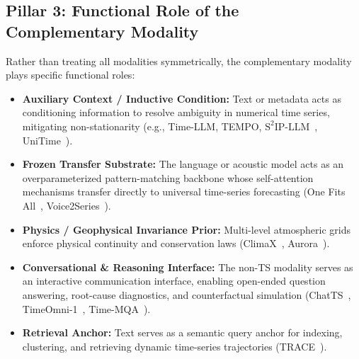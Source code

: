 \subsection{Pillar 3: Functional Role of the Complementary Modality}
Rather than treating all modalities symmetrically, the complementary modality plays specific functional roles:
\begin{itemize}
    \item \textbf{Auxiliary Context / Inductive Condition:} Text or metadata acts as conditioning information to resolve ambiguity in numerical time series, mitigating non-stationarity (e.g., Time-LLM, TEMPO, $\text{S}^2\text{IP-LLM}$~\cite{Pan2024S2IPLLM}, UniTime~\cite{Liu2024UniTime}).
    \item \textbf{Frozen Transfer Substrate:} The language or acoustic model acts as an overparameterized pattern-matching backbone whose self-attention mechanisms transfer directly to universal time-series forecasting (One Fits All~\cite{Zhou2023OneFitsAll}, Voice2Series~\cite{Yang2021Voice2Series}).
    \item \textbf{Physics / Geophysical Invariance Prior:} Multi-level atmospheric grids enforce physical continuity and conservation laws (ClimaX~\cite{Nguyen2023ClimaX}, Aurora~\cite{Bodnar2024Aurora}).
    \item \textbf{Conversational \& Reasoning Interface:} The non-TS modality serves as an interactive communication interface, enabling open-ended question answering, root-cause diagnostics, and counterfactual simulation (ChatTS~\cite{Zhao2024ChatTS}, TimeOmni-1~\cite{Tan2025TimeOmni1}, Time-MQA~\cite{Shen2025TimeMQA}).
    \item \textbf{Retrieval Anchor:} Text serves as a semantic query anchor for indexing, clustering, and retrieving dynamic time-series trajectories (TRACE~\cite{Chen2025TRACE}).
\end{itemize}

